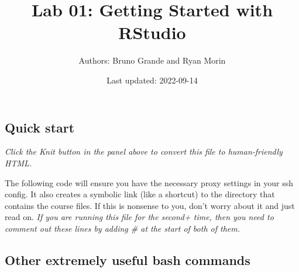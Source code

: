 \documentclass[
]{article}
\title{Lab 01: Getting Started with RStudio}
\author{Authors: Bruno Grande and Ryan Morin}
\date{Last updated: 2022-09-14}
\newenvironment{Shaded}{\begin{snugshade}}{\end{snugshade}}
\begin{document}
\maketitle

\hypertarget{quick-start}{%
\subsection{Quick start}\label{quick-start}}

\emph{Click the Knit button in the panel above to convert this file to
human-friendly HTML.}

The following code will ensure you have the necessary proxy settings in
your ssh config. It also creates a symbolic link (like a shortcut) to
the directory that contains the course files. If this is nonsense to
you, don't worry about it and just read on. \emph{If you are running
this file for the second+ time, then you need to comment out these lines
by adding \# at the start of both of them.}

\begin{Shaded}
\begin{Highlighting}[]

\end{Highlighting}
\end{Shaded}

\hypertarget{other-extremely-useful-bash-commands}{%
\subsection{Other extremely useful bash
commands}\label{other-extremely-useful-bash-commands}}
\end{document}
